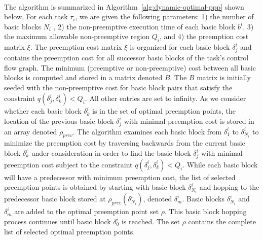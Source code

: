 \noindent
\\
The algorithm is summarized in Algorithm~\ref{alg:dynamic-optimal-ppp} shown below.  For each task $\tau_i$, we are given the following parameters: 1) the number of basic blocks $N_i$ , 2) the non-preemptive execution time of each basic block $b^i$, 3) the maximum allowable non-preemptive region $Q_i$, and 4) the preemption cost matrix $\xi$.  The preemption cost matrix $\xi$ is organized for each basic block \begin{math}\delta_{j}^{i}\end{math} and contains the preemption cost for all successor basic blocks of the task's control flow graph.  The minimum (preemptive or non-preemptive) cost between all basic blocks is computed and stored in a matrix denoted $B$.  The $B$ matrix is initially seeded with the non-preemptive cost for basic block pairs that satisfy the constraint $q(\delta_{j}^{i},\delta_{k}^{i}) < Q_{i}$. All other entries are set to infinity.  As we consider whether each basic block $\delta_{k}^{i}$ is in the set of optimal preemption points, the location of the previous basic block $\delta_{j}^{i}$ with minimal preemption cost is stored in an array denoted $\rho_{prev}$.  The algorithm examines each basic block from \begin{math}\delta_{1}^{i}\end{math} to \begin{math}\delta_{N_i}^{i}\end{math} to minimize the preemption cost by traversing backwards from the current basic block $\delta_{k}^{i}$ under consideration in order to find the basic block $\delta_{j}^{i}$ with minimal preemption cost subject to the constraint $q(\delta_{j}^{i},\delta_{k}^{i}) < Q_{i}$.  While each basic block will have a predecessor with minimum preemption cost, the list of selected preemption points is obtained by starting with basic block $\delta_{N_i}^{i}$ and hopping to the predecessor basic block stored at $\rho_{prev}(\delta_{N_i}^{i})$, denoted $\delta_{m}^{i}$.  Basic blocks $\delta_{N_i}^{i}$ and $\delta_{m}^{i}$ are added to the optimal preemption point set $\rho$.  This basic block hopping process continues until basic block $\delta_{0}^{i}$ is reached.  The set $\rho$ contains the complete list of selected optimal preemption points.

